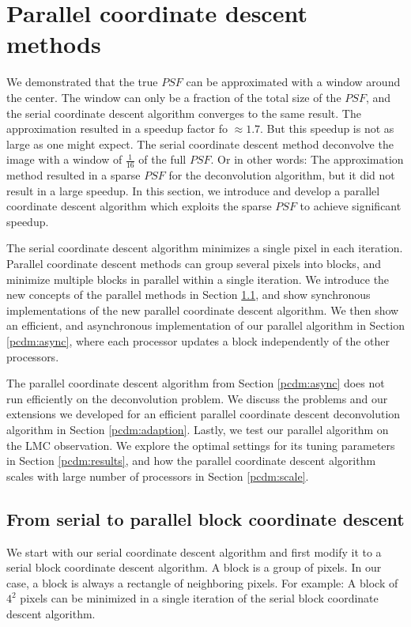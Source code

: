 \section{Parallel coordinate descent methods}\label{pcdm}
We demonstrated that the true $PSF$ can be approximated with a window around the center. The window can only be a fraction of the total size of the $PSF$, and the serial coordinate descent algorithm converges to the same result. The approximation resulted in a speedup factor fo $\approx 1.7$. But this speedup is not as large as one might expect. The serial coordinate descent method deconvolve the image with a window of $\frac{1}{16}$ of the full $PSF$. Or in other words: The approximation method resulted in a sparse $PSF$ for the deconvolution algorithm, but it did not result in a large speedup. In this section, we introduce and develop a parallel coordinate descent algorithm which exploits the sparse $PSF$ to achieve significant speedup.

The serial coordinate descent algorithm minimizes a single pixel in each iteration. Parallel coordinate descent methods can group several pixels into blocks, and minimize multiple blocks in parallel within a single iteration. We introduce the new concepts of the parallel methods in Section \ref{pcdm:pcdm}, and show synchronous implementations of the new parallel coordinate descent algorithm. We then show an efficient, and asynchronous implementation of our parallel algorithm in Section \ref{pcdm:async}, where each processor updates a block independently of the other processors.

The parallel coordinate descent algorithm from Section \ref{pcdm:async} does not run efficiently on the deconvolution problem. We discuss the problems and our extensions we developed for an efficient parallel coordinate descent deconvolution algorithm in Section \ref{pcdm:adaption}. Lastly, we test our parallel algorithm on the LMC observation. We explore the optimal settings for its tuning parameters in Section \ref{pcdm:results}, and how the parallel coordinate descent algorithm scales with large number of processors  in Section \ref{pcdm:scale}.


\subsection{From serial to parallel block coordinate descent}\label{pcdm:pcdm}
We start with our serial coordinate descent algorithm and first modify it to a serial block coordinate descent algorithm. A block is a group of pixels. In our case, a block is always a rectangle of neighboring pixels. For example: A block of $4^2$ pixels can be minimized in a single iteration of the serial block coordinate descent algorithm.

